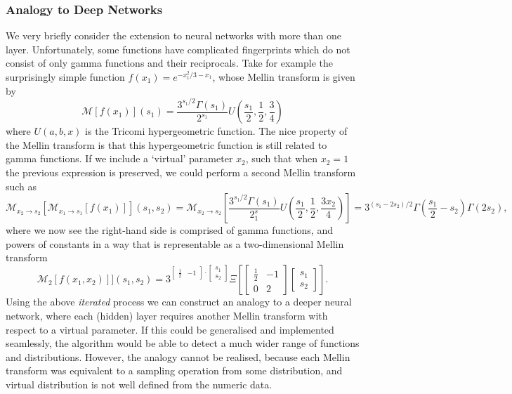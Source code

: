 \documentclass{article}
\begin{document}
\subsubsection{Analogy to Deep Networks}
We very briefly consider the extension to neural networks with more than one layer. Unfortunately, some functions have complicated fingerprints which do not consist of only gamma functions and their reciprocals. Take for example the surprisingly simple function $f(x_1) = e^{-x^2_1/3 - x_1}$, whose Mellin transform is given by \begin{equation}
\mathcal{M}[f(x_1)](s_1) = \frac{3^{s_1/2}\Gamma(s_1)}{2^{s_1}}U\left(\frac{s_1}{2},\frac{1}{2},\frac{3}{4}\right)
\end{equation}
where $U(a,b,x)$ is the Tricomi hypergeometric function. The nice property of the Mellin transform is that this hypergeometric function is still related to gamma functions. If we include a `virtual' parameter $x_2$, such that when $x_2=1$ the previous expression is preserved, we could perform a second Mellin transform such as 
\begin{equation}
\mathcal{M}_{x_2 \to s_2}[\mathcal{M}_{x_1 \to s_1}[f(x_1)]](s_1,s_2) =\mathcal{M}_{x_2 \to s_2}\left[ \frac{3^{s_1/2}\Gamma(s_1)}{2^s_1}U\left(\frac{s_1}{2},\frac{1}{2},\frac{3x_2}{4}\right) \right] = 3^{(s_1-2s_2)/2}\Gamma\left(\frac{s_1}{2}-s_2\right)\Gamma(2s_2),
\end{equation}
where we now see the right-hand side is comprised of gamma functions, and powers of constants in a way that is representable as a two-dimensional Mellin transform
\begin{equation}
\mathcal{M}_2[f(x_1,x_2)]](s_1,s_2) = 3^{\begin{bmatrix} \frac{1}{2} & -1 \end{bmatrix}\cdot\begin{bmatrix} s_1 \\ s_2 \end{bmatrix}} \Xi \left[\begin{bmatrix} \frac{1}{2} & -1 \\ 0 &  2\end{bmatrix}\begin{bmatrix} s_1 \\ s_2 \end{bmatrix}  \right].
\end{equation}
Using the above \emph{iterated} process we can construct an analogy to a deeper neural network, where each (hidden) layer requires another Mellin transform with respect to a virtual parameter. If this could be generalised and implemented seamlessly, the algorithm would be able to detect a much wider range of functions and distributions. However, the analogy cannot be realised, because each Mellin transform was equivalent to a sampling operation from some distribution, and virtual distribution is not well defined from the numeric data.\\
\end{document}
